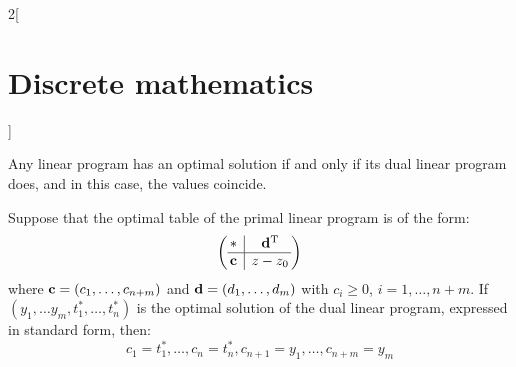 \documentclass[../../../main.tex]{subfiles}
\begin{document}
\begin{multicols}{2}[\section{Discrete mathematics}]
\begin{theorem}
        Any linear program has an optimal solution if and only if its dual linear program does, and in this case, the values coincide.
    \end{theorem}
    \begin{theorem}
        Suppose that the optimal table of the primal linear program is of the form:
        $$\left(
            \begin{array}{@{\,} c|c @{\,}}
                    *                  & \transpose{d} \\
                    \hline
                    \vectorfunction{c} & z-z_0         \\
                \end{array}\right)$$ where $\boldsymbol{\mathrm{c}}=(c_1,\ldots,c_{n+m})$ and $\boldsymbol{\mathrm{d}}=(d_1,\ldots,d_m)$ with $c_i\geq0$, $i=1,\ldots,n+m$. If $(y_1,\ldots y_m,t_1^*,\ldots,t_n^*)$ is the optimal solution of the dual linear program, expressed in standard form, then: $$c_1=t_1^*,\ldots,c_n=t_n^*, c_{n+1}=y_1,\ldots,c_{n+m}=y_m$$
    \end{theorem}
\end{multicols}
\end{document}
